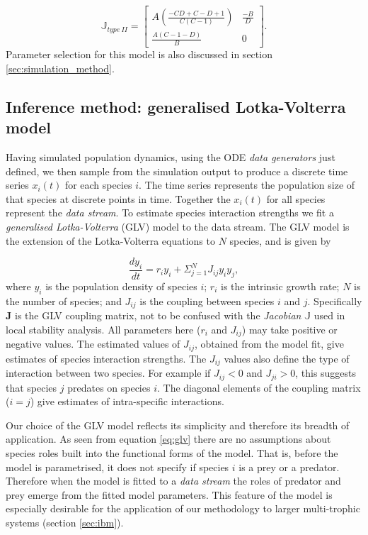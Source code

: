 \begin{equation}\label{eq:jac2}
\mathbb{J}_{type\ II} = 
\begin{bmatrix}
A\left(\frac{-CD +C -D + 1}{C(C-1)}\right) & \frac{-B}{D} \\ \frac{A(C-1-D)}{B} & 0
\end{bmatrix}  	.
\end{equation}
%
Parameter selection for this model is also discussed in section \ref{sec:simulation_method}. 


\subsection{Inference method: generalised Lotka-Volterra model}
\label{sec:def_GLV}

Having simulated population dynamics, using the ODE \emph{data generators} just defined, we then sample from the simulation output to produce a discrete time series $x_i(t)$ for each species $i$. The time series represents the population size of that species at discrete points in time. Together the $x_i(t)$ for all species represent the \emph{data stream}. To estimate species interaction strengths we fit a \emph{generalised Lotka-Volterra} (GLV) model to the data stream. The GLV model is the extension of the Lotka-Volterra equations to $N$ species, and is given by

\begin{equation}
\frac{dy_i}{dt} = r_iy_i + \Sigma_{j=1}^N J_{ij}y_iy_j,
\label{eq:glv}
\end{equation}
%
where $y_i$ is the population density of species $i$; $r_i$ is the intrinsic growth rate; $N$ is the number of species; and $J_{ij}$ is the coupling between species $i$ and $j$. Specifically $\mathbf{J}$ is the GLV coupling matrix, not to be confused with the \emph{Jacobian} $\mathbb{J}$ used in local stability analysis. All parameters here ($r_i$ and $J_{ij}$) may take positive or negative values. The estimated values of $J_{ij}$, obtained from the model fit, give estimates of species interaction strengths. The $J_{ij}$ values also define the type of interaction between two species. For example if $J_{ij} < 0$ and $J_{ji} > 0$, this suggests that species $j$ predates on species $i$. The diagonal elements of the coupling matrix ($i=j$) give estimates of intra-specific interactions.

Our choice of the GLV model reflects its simplicity and therefore its breadth of application. As seen from equation \eqref{eq:glv} there are no assumptions about species roles built into the functional forms of the model. That is, before the model is parametrised, it does not specify if species $i$ is a prey or a predator. Therefore when the model is fitted to a \emph{data stream} the roles of predator and prey emerge from the fitted model parameters. This feature of the model is especially desirable for the application of our methodology to larger multi-trophic systems (section \ref{sec:ibm}). 

